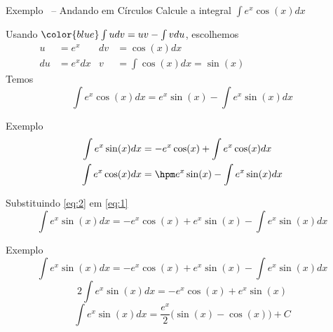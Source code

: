 \begin{frame}{Exemplo \theexemplo\  -- Andando em Círculos}
  Calcule a integral \(\int e^x \cos(x) dx\)

  \pause
  Usando \({\color{blue}\int udv = uv - \int v  du}\), escolhemos
  \pause
  \begin{align*}
    u  & = e^x   & dv & = \cos(x) dx                & \hspace{3cm}~ \\
    du & = e^xdx & v  & = \int \cos(x) dx = \sin(x) &
  \end{align*}
  \pause
  Temos
  \[
    \int e^x \cos(x) dx
    = e^x \sin(x) - \int e^x \sin(x) dx
  \]
\end{frame}

\begin{frame}{Exemplo \theexemplo}
  \begin{align}
    \int e^x \sin(x) dx & = -e^x \cos(x)+ \int e^x \cos(x) dx      \label{eq:1} \\
    \int e^x \cos(x) dx & = \hpm e^x \sin(x) - \int e^x \sin(x) dx \label{eq:2}
  \end{align}

  \pause
  Substituindo \eqref{eq:2} em \eqref{eq:1}
  \[
    \int e^x \sin(x) dx
    = -e^x \cos(x) + e^x \sin(x) - \int e^x \sin(x) dx
  \]
\end{frame}

\begin{frame}{Exemplo \theexemplo}
  \[ \int e^x \sin(x) dx  = -e^x \cos(x) + e^x \sin(x) - \int e^x \sin(x) dx \]
  \pause
  \[ 2\int e^x \sin(x) dx = -e^x \cos(x)+ e^x \sin(x)                        \]
  \pause
  \[ \int e^x \sin(x) dx  = \frac{e^x}{2}\big(\sin(x) -\cos(x)\big) + C      \]
\end{frame}

